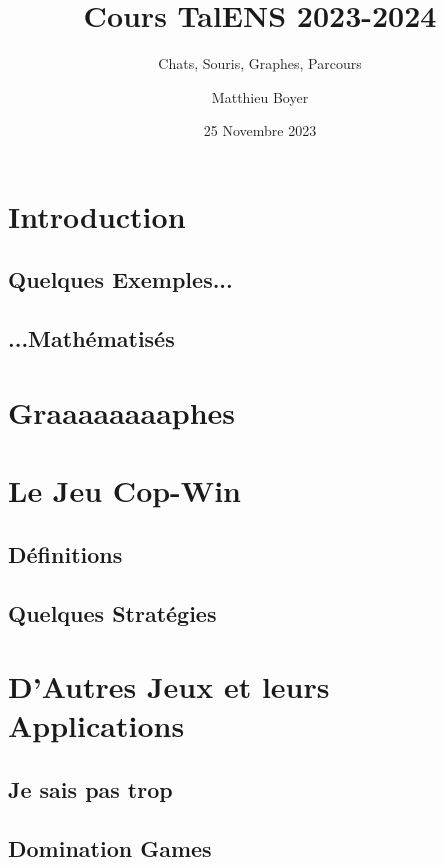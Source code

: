 \documentclass{beamercours}
\author{Matthieu Boyer}
\title{Cours TalENS 2023-2024}
\subtitle{Chats, Souris, Graphes, Parcours}
\date{25 Novembre 2023}
\begin{document}
\maketitle
\section*{Introduction}
\subsection{Quelques Exemples...}
\subsection{...Mathématisés}

\section{Graaaaaaaaphes}

\section{Le Jeu Cop-Win}
\subsection{Définitions}

\subsection{Quelques Stratégies}

\section{D'Autres Jeux et leurs Applications}
\subsection{Je sais pas trop}

\subsection{Domination Games}
\end{document}
